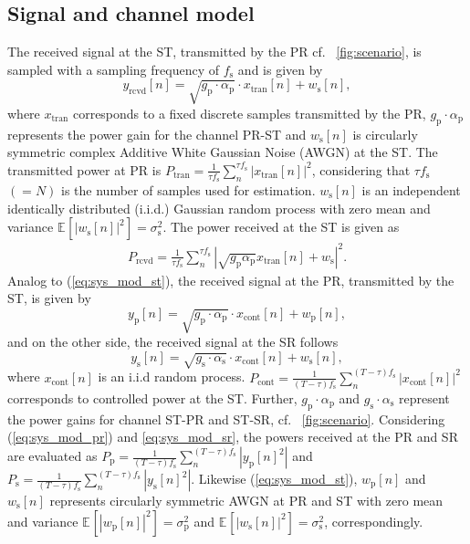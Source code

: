 \documentclass[conference, twocolumn]{IEEEtran}
\newcommand{\e}[2]{{\mathbb E}_{#1}\left[ #2 \right]}
\newcommand{\s}[2]{{\frac{1}{{#1}}\sum_n^{#1}} {#2}}
\newcommand{\sub}[1]{_{\text{#1}}}
\newcommand{\preg}{P\sub{cont}}
\newcommand{\xreg}{x\sub{cont}}
\newcommand{\prcvd}{P\sub{rcvd}}
\newcommand{\yrcvd}{y\sub{rcvd}}
\newcommand{\ptran}{P\sub{tran}}
\newcommand{\xtran}{x\sub{tran}}
\newcommand{\pp}{P\sub{p}}
\newcommand{\ps}{P\sub{s}}
\newcommand{\yp}{y\sub{p}}
\newcommand{\ys}{y\sub{s}}
\newcommand{\nap}{w\sub{p}}
\newcommand{\nas}{w\sub{s}}
\newcommand{\gp}{g\sub{p}}
\newcommand{\gs}{g\sub{s}}
\newcommand{\ap}{\alpha\sub{p}}
\newcommand{\as}{\alpha\sub{s}}
\newcommand{\npp}{\sigma^2\sub{p}}
\newcommand{\nps}{\sigma^2\sub{s}}
\newcommand{\fsam}{f\sub{s}}
\begin{document}
\subsection{Signal and channel model}
The received signal at the ST, transmitted by the PR cf. \figurename~\ref{fig:scenario}, is sampled with a sampling frequency of $\fsam$ and is given by
\begin{equation}
\yrcvd[n] = \sqrt{\gp \cdot \ap} \cdot \xtran[n] + \nas[n],
\label{eq:sys_mod_st}
\end{equation}
where $\xtran$ corresponds to a fixed discrete samples transmitted by the PR, $\gp \cdot \ap$ represents the power gain for the channel PR-ST and $\nas[n]$ is circularly symmetric complex Additive White Gaussian Noise (AWGN) at the ST. 
The transmitted power at PR is $\ptran = \s{\tau \fsam}{|\xtran[n]|^2}$, considering that $\tau \fsam$ $(= N)$ is the number of samples used for estimation. $\nas[n]$ is an independent identically distributed (i.i.d.) Gaussian random process with zero mean and variance $\e{}{|\nas[n]|^2} = \nps$. The power received at the ST is given as 
\begin{align}
\prcvd = \s{\tau \fsam}{ |\sqrt{\gp \ap} \xtran[n] + \nas|^2}.
\label{eq:prcvd} 
\end{align}
Analog to (\ref{eq:sys_mod_st}), the received signal at the PR, transmitted by the ST, is given by
\begin{equation}
\yp[n] = \sqrt{\gp \cdot \ap} \cdot \xreg[n] + \nap[n],
\label{eq:sys_mod_pr}
\end{equation}
and on the other side, the received signal at the SR follows 
\begin{equation}
\ys[n] = \sqrt{\gs \cdot \as} \cdot \xreg[n] + \nas[n],
\label{eq:sys_mod_sr}
\end{equation}
where $\xreg[n]$ is an i.i.d random process. $\preg = \s{(T - \tau) \fsam}{|\xreg[n]|^2}$ corresponds to controlled power at the ST. Further, $\gp \cdot \ap$ and $\gs \cdot \as$ represent the power gains for channel ST-PR and ST-SR, cf. \figurename~\ref{fig:scenario}. 
Considering (\ref{eq:sys_mod_pr}) and \ref{eq:sys_mod_sr}, the powers received at the PR and SR are evaluated as $\pp = \s{(T - \tau) \fsam}{|\yp[n]^2|}$ and $\ps = \s{(T - \tau) \fsam}{|\ys[n]^2|}$. Likewise (\ref{eq:sys_mod_st}), $\nap[n]$ and $\nas[n]$ represents circularly symmetric AWGN at PR and ST with zero mean and variance $\e{}{|\nap[n]|^2} = \npp$ and $\e{}{|\nas[n]|^2} = \nps$, correspondingly. %
\end{document}
